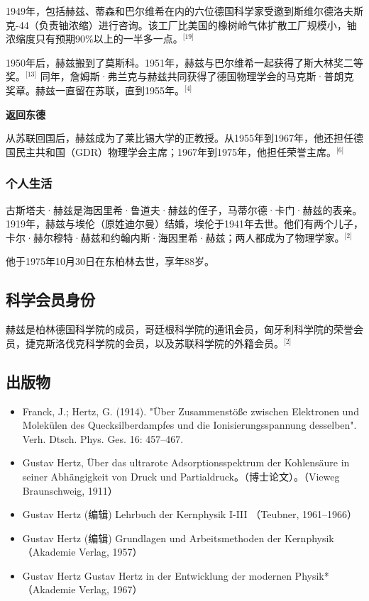 1949年，包括赫兹、蒂森和巴尔维希在内的六位德国科学家受邀到斯维尔德洛夫斯克-44（负责铀浓缩）进行咨询。该工厂比美国的橡树岭气体扩散工厂规模小，铀浓缩度只有预期90\%以上的一半多一点。\(^\text{[19]}\)

1950年后，赫兹搬到了莫斯科。1951年，赫兹与巴尔维希一起获得了斯大林奖二等奖。\(^\text{[13]}\) 同年，詹姆斯·弗兰克与赫兹共同获得了德国物理学会的马克斯·普朗克奖章。赫兹一直留在苏联，直到1955年。\(^\text{[4]}\)

\textbf{返回东德}

从苏联回国后，赫兹成为了莱比锡大学的正教授。从1955年到1967年，他还担任德国民主共和国（GDR）物理学会主席；1967年到1975年，他担任荣誉主席。\(^\text{[6]}\)
\subsubsection{个人生活}
古斯塔夫·赫兹是海因里希·鲁道夫·赫兹的侄子，马蒂尔德·卡门·赫兹的表亲。1919年，赫兹与埃伦（原姓迪尔曼）结婚，埃伦于1941年去世。他们有两个儿子，卡尔·赫尔穆特·赫兹和约翰内斯·海因里希·赫兹；两人都成为了物理学家。\(^\text{[2]}\)

他于1975年10月30日在东柏林去世，享年88岁。
\subsection{科学会员身份}
赫兹是柏林德国科学院的成员，哥廷根科学院的通讯会员，匈牙利科学院的荣誉会员，捷克斯洛伐克科学院的会员，以及苏联科学院的外籍会员。\(^\text{[2]}\)

\subsection{出版物}
\begin{itemize}
\item Franck, J.; Hertz, G. (1914). "Über Zusammenstöße zwischen Elektronen und Molekülen des Quecksilberdampfes und die Ionisierungsspannung desselben". Verh. Dtsch. Phys. Ges. 16: 457–467.
\item Gustav Hertz, Über das ultrarote Adsorptionsspektrum der Kohlensäure in seiner Abhängigkeit von Druck und Partialdruck。（博士论文）。（Vieweg Braunschweig, 1911）
\item Gustav Hertz (编辑) Lehrbuch der Kernphysik I-III （Teubner, 1961–1966）
\item Gustav Hertz (编辑) Grundlagen und Arbeitsmethoden der Kernphysik（Akademie Verlag, 1957）
\item Gustav Hertz Gustav Hertz in der Entwicklung der modernen Physik*（Akademie Verlag, 1967）
\end{itemize}

